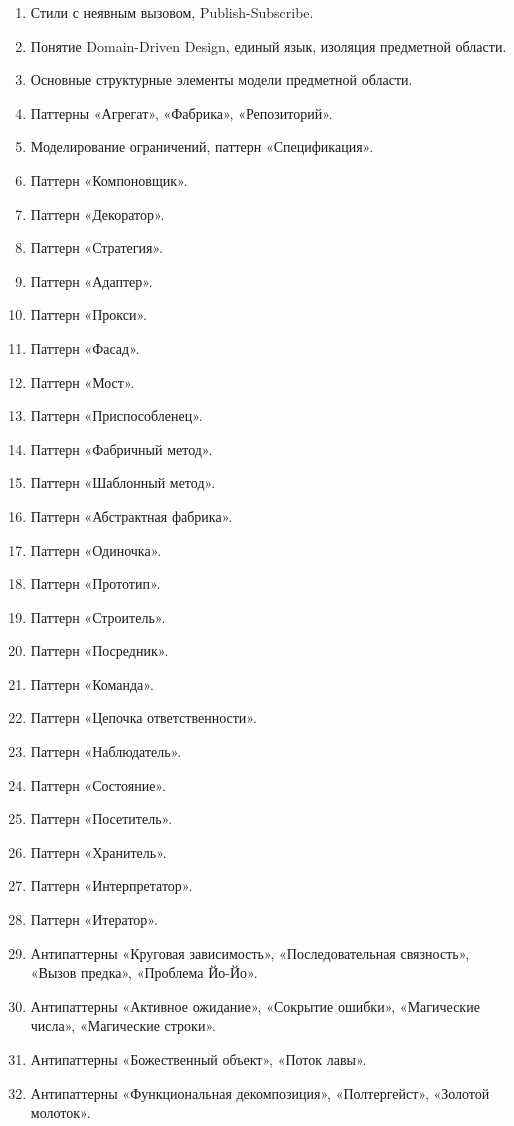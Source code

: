 \documentclass[a5paper]{article}
\begin{document}
\begin{enumerate}
    \item Стили с неявным вызовом, Publish-Subscribe.
    \item Понятие Domain-Driven Design, единый язык, изоляция предметной области.
    \item Основные структурные элементы модели предметной области.
    \item Паттерны «Агрегат», «Фабрика», «Репозиторий».
    \item Моделирование ограничений, паттерн «Спецификация».
    \item Паттерн «Компоновщик».
    \item Паттерн «Декоратор».
    \item Паттерн «Стратегия».
    \item Паттерн «Адаптер».
    \item Паттерн «Прокси».
    \item Паттерн «Фасад».
    \item Паттерн «Мост».
    \item Паттерн «Приспособленец».
    \item Паттерн «Фабричный метод».
    \item Паттерн «Шаблонный метод».
    \item Паттерн «Абстрактная фабрика».
    \item Паттерн «Одиночка».
    \item Паттерн «Прототип».
    \item Паттерн «Строитель».
    \item Паттерн «Посредник».
    \item Паттерн «Команда».
    \item Паттерн «Цепочка ответственности».
    \item Паттерн «Наблюдатель».
    \item Паттерн «Состояние».
    \item Паттерн «Посетитель».
    \item Паттерн «Хранитель».
    \item Паттерн «Интерпретатор».
    \item Паттерн «Итератор».
    \item Антипаттерны «Круговая зависимость», «Последовательная связность», «Вызов предка», «Проблема Йо-Йо».
    \item Антипаттерны «Активное ожидание», «Сокрытие ошибки», «Магические числа», «Магические строки».
    \item Антипаттерны «Божественный объект», «Поток лавы».
    \item Антипаттерны «Функциональная декомпозиция», «Полтергейст», «Золотой молоток».

\end{enumerate}
\end{document}
